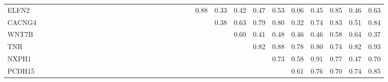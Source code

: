 \begin{longtable}{lrrrrrrrrrrrrrrrrrrrrrrrrrrrrrrrr}
ELFN2   &             &               &             &            &            &              &            &             &               &             &              &             &            &               &             &              &             &              &             &              &               &             &         0.88 &        0.33 &      0.42 &        0.47 &         0.53 &        0.06 &       0.45 &        0.85 &       0.46 &        0.63 \\
CACNG4  &             &               &             &            &            &              &            &             &               &             &              &             &            &               &             &              &             &              &             &              &               &             &              &        0.38 &      0.63 &        0.79 &         0.80 &        0.32 &       0.74 &        0.83 &       0.51 &        0.84 \\
WNT7B   &             &               &             &            &            &              &            &             &               &             &              &             &            &               &             &              &             &              &             &              &               &             &              &             &      0.60 &        0.41 &         0.48 &        0.46 &       0.46 &        0.58 &       0.64 &        0.37 \\
TNR     &             &               &             &            &            &              &            &             &               &             &              &             &            &               &             &              &             &              &             &              &               &             &              &             &           &        0.82 &         0.88 &        0.78 &       0.80 &        0.74 &       0.82 &        0.93 \\
NXPH1   &             &               &             &            &            &              &            &             &               &             &              &             &            &               &             &              &             &              &             &              &               &             &              &             &           &             &         0.73 &        0.58 &       0.91 &        0.77 &       0.47 &        0.70 \\
PCDH15  &             &               &             &            &            &              &            &             &               &             &              &             &            &               &             &              &             &              &             &              &               &             &              &             &           &             &              &        0.61 &       0.76 &        0.70 &       0.74 &        0.85 \\

\end{longtable}
